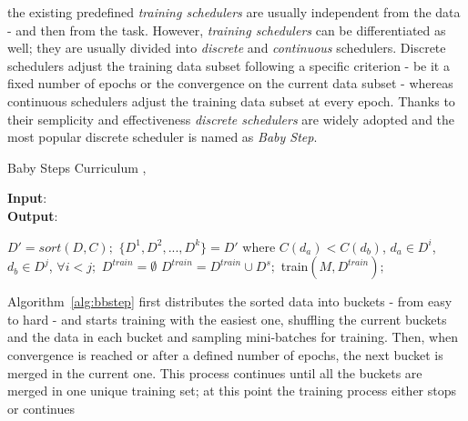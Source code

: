 the existing predefined \textit{training schedulers} are usually independent from the data - and then from the task.
However, \textit{training schedulers} can be differentiated as well; they are usually divided into \textit{discrete} and \textit{continuous} schedulers.
Discrete schedulers adjust the training data subset following a specific criterion - 
be it a fixed number of epochs or the convergence on the current data subset - whereas continuous schedulers adjust 
the training data subset at every epoch.
Thanks to their semplicity and effectiveness \textit{discrete schedulers} are widely adopted and the most popular
discrete scheduler is named as \textit{Baby Step}. 
\begin{algorithm}
    \caption{Baby Steps Curriculum \cite{cirik2016visualizing}, \cite{wang2021survey}}\label{alg:bbstep}
    \hspace*{\algorithmicindent} \textbf{Input}: \\
    \hspace*{\algorithmicindent} \textbf{Output}: 
    \begin{algorithmic}[1]
    \State $D'= sort(D,C);$
    \State $\lbrace D^1, D^2,...,D^k \rbrace = D'$ where $C(d_a) < C(d_b)$, $d_a\in D^i$, $d_b\in D^j$, $\forall i<j;$
    \State $D^{train} = \emptyset$
        \State $D^{train} = D^{train} \cup D^s;$
        \State train$(M, D^{train});$
        \EndWhile
    \EndFor
    \end{algorithmic}
\end{algorithm}
\newline
Algorithm~\ref{alg:bbstep} first distributes the sorted data into buckets - from easy to hard - and starts training with the easiest one, 
shuffling the current buckets and the data in each bucket and sampling mini-batches for training.
Then, when convergence is reached or after a defined number of epochs, the next bucket is merged in the current one. 
This process continues until all the buckets are merged in one unique training set; at this point the training process either stops or continues 
